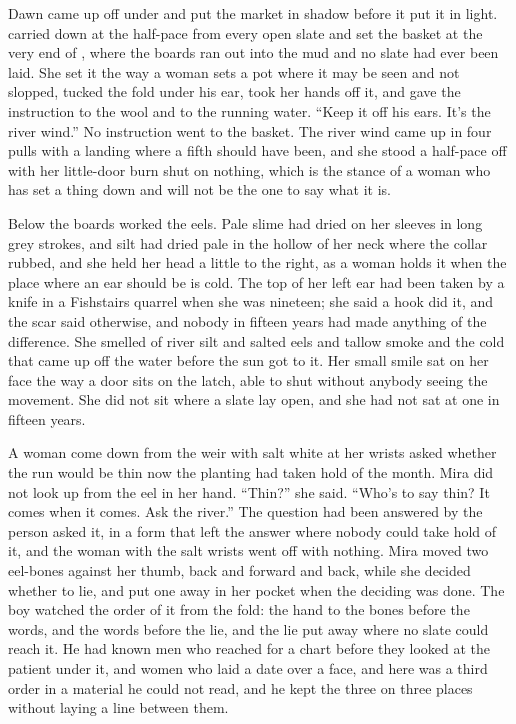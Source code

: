Dawn came up off  under  and put the market in shadow before it put it in light.  carried  down at the half-pace from every open slate and set the basket at the very end of , where the boards ran out into the mud and no slate had ever been laid. She set it the way a woman sets a pot where it may be seen and not slopped, tucked the fold under his ear, took her hands off it, and gave the instruction to the wool and to the running water. “Keep it off his ears. It's the river wind.” No instruction went to the basket. The river wind came up  in four pulls with a landing where a fifth should have been, and she stood a half-pace off with her little-door burn shut on nothing, which is the stance of a woman who has set a thing down and will not be the one to say what it is.

Below the boards  worked the eels. Pale slime had dried on her sleeves in long grey strokes, and silt had dried pale in the hollow of her neck where the collar rubbed, and she held her head a little to the right, as a woman holds it when the place where an ear should be is cold. The top of her left ear had been taken by a knife in a Fishstairs quarrel when she was nineteen; she said a hook did it, and the scar said otherwise, and nobody in fifteen years had made anything of the difference. She smelled of river silt and salted eels and tallow smoke and the cold that came up off the water before the sun got to it. Her small smile sat on her face the way a door sits on the latch, able to shut without anybody seeing the movement. She did not sit where a slate lay open, and she had not sat at one in fifteen years.

A woman come down from the weir with salt white at her wrists asked whether the run would be thin now the planting had taken hold of the month. Mira did not look up from the eel in her hand. “Thin?” she said. “Who's to say thin? It comes when it comes. Ask the river.” The question had been answered by the person asked it, in a form that left the answer where nobody could take hold of it, and the woman with the salt wrists went off with nothing. Mira moved two eel-bones against her thumb, back and forward and back, while she decided whether to lie, and put one away in her pocket when the deciding was done. The boy watched the order of it from the fold: the hand to the bones before the words, and the words before the lie, and the lie put away where no slate could reach it. He had known men who reached for a chart before they looked at the patient under it, and women who laid a date over a face, and here was a third order in a material he could not read, and he kept the three on three places without laying a line between them.

